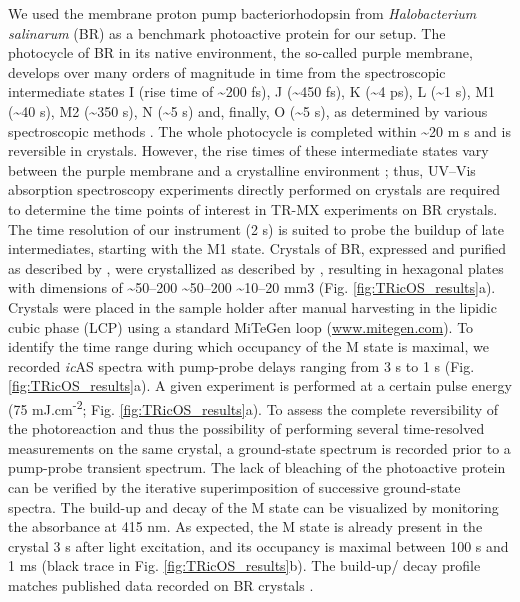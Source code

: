 We used the membrane proton pump bacteriorhodopsin from \textit{Halobacterium salinarum} (BR) as a benchmark photoactive protein for our setup. The photocycle of BR in its native environment, the so-called purple membrane, develops over many orders of magnitude in time from the spectroscopic intermediate states I (rise time of \textasciitilde200 fs), J (\textasciitilde450 fs), K (\textasciitilde4 ps), L (\textasciitilde1 \textmu s), M1 (\textasciitilde40 \textmu s), M2 (\textasciitilde350 \textmu s), N (\textasciitilde5 \textmu s) and, finally, O (\textasciitilde5 \textmu s), as determined by various spectroscopic methods \parencite{doigPicosecondTimeresolvedResonance1991, neutzeBacteriorhodopsinHighresolutionStructural2002}. The whole photocycle is completed within \textasciitilde20 m s and is reversible in crystals. However, the rise times of these intermediate states vary between the purple membrane and a crystalline environment \parencite{efremovTimeResolvedMicrospectroscopySingle2006, weinertProtonUptakeMechanism2019}; thus, UV–Vis absorption spectroscopy experiments directly performed on crystals are required to determine the time points of interest in TR-MX experiments on BR crystals. The time resolution of our instrument (2 \textmu s) is suited to probe the buildup of late intermediates, starting with the M1 state.
Crystals of BR, expressed and purified as described by \cite{gordeliyCrystallizationLipidicCubic2003}, were crystallized as described by \cite{borshchevskiyTrueatomicresolutionInsightsStructure2022}, resulting in hexagonal plates with dimensions of \textasciitilde50–200 \textasciitilde 50–200 \textasciitilde 10–20 mm3 (Fig. \ref{fig:TRicOS_results}a). Crystals were placed in the sample holder after manual harvesting in the lipidic cubic phase (LCP) using a standard MiTeGen loop (\href{https://www.mitegen.com}{www.mitegen.com}).
To identify the time range during which occupancy of the M state is maximal, we recorded \textit{ic}AS spectra with pump-probe delays ranging from 3 \textmu s to 1 s (Fig. \ref{fig:TRicOS_results}a). A given experiment is performed at a certain pulse energy (75 mJ.cm\textsuperscript{-2}; Fig. \ref{fig:TRicOS_results}a). To assess the complete reversibility of the photoreaction and thus the possibility of performing several time-resolved measurements on the same crystal, a ground-state spectrum is recorded prior to a pump-probe transient spectrum. The lack of bleaching of the photoactive protein can be verified by the iterative superimposition of successive ground-state spectra. The build-up and decay of the M state can be visualized by monitoring the absorbance at 415 nm. As expected, the M state is already present in the crystal 3 \textmu s after light excitation, and its occupancy is maximal between 100 \textmu s and 1 ms (black trace in Fig. \ref{fig:TRicOS_results}b). The build-up/ decay profile matches published data recorded on BR crystals \parencite{efremovTimeResolvedMicrospectroscopySingle2006}.
